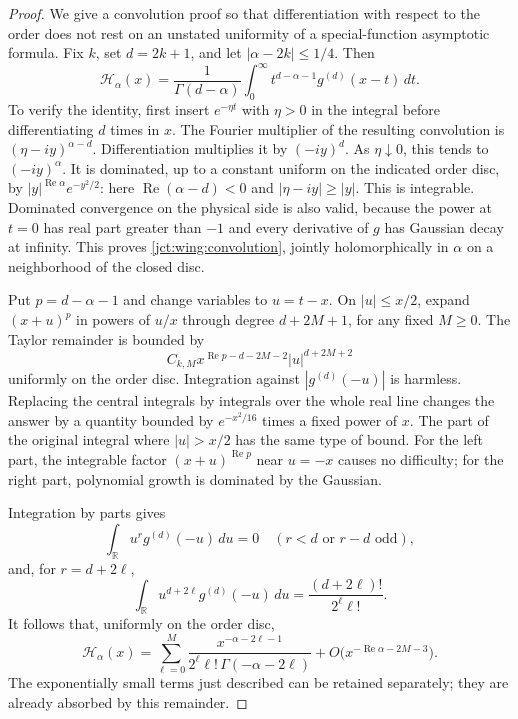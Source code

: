 \begin{proof}
We give a convolution proof so that differentiation with respect to
the order does not rest on an unstated uniformity of a special-function
asymptotic formula.  Fix $k$, set $d=2k+1$, and let
$|\alpha-2k|\le1/4$.  Then
\begin{equation}\label{jct:wing:convolution}
 \mathcal H_\alpha(x)
 =\frac1{\Gamma(d-\alpha)}\int_0^\infty
               t^{d-\alpha-1}g^{(d)}(x-t)\,dt.
\end{equation}
To verify the identity, first insert $e^{-\eta t}$ with $\eta>0$
in the integral before differentiating $d$ times in $x$.  The Fourier
multiplier of the resulting convolution is
$(\eta-iy)^{\alpha-d}$.  Differentiation multiplies it by
$(-iy)^d$.  As $\eta\downarrow0$, this tends to $(-iy)^\alpha$.
It is dominated, up to a constant uniform on the indicated order
disc, by $|y|^{\operatorname{Re}\alpha}e^{-y^2/2}$: here
$\operatorname{Re}(\alpha-d)<0$ and $|\eta-iy|\ge|y|$.
This is integrable.  Dominated convergence on the physical side is
also valid, because the power at $t=0$ has real part greater than
$-1$ and every derivative of $g$ has Gaussian decay at infinity.
This proves \eqref{jct:wing:convolution}, jointly holomorphically in
$\alpha$ on a neighborhood of the closed disc.

Put $p=d-\alpha-1$ and change variables to $u=t-x$.  On
$|u|\le x/2$, expand $(x+u)^p$ in powers of $u/x$ through degree
$d+2M+1$, for any fixed $M\ge0$.  The Taylor remainder is bounded by
\[
 C_{k,M}x^{\operatorname{Re}p-d-2M-2}|u|^{d+2M+2}
\]
uniformly on the order disc.  Integration against
$|g^{(d)}(-u)|$ is harmless.  Replacing the central integrals by
integrals over the whole real line changes the answer by a quantity
bounded by $e^{-x^2/16}$ times a fixed power of $x$.
The part of the original integral where $|u|>x/2$ has the same
type of bound.  For the left part, the integrable factor
$(x+u)^{\operatorname{Re}p}$ near $u=-x$ causes no difficulty;
for the right part, polynomial growth is dominated by the Gaussian.

Integration by parts gives
\[
 \int_{\mathbb R}u^r g^{(d)}(-u)\,du=0
 \quad(r<d\text{ or }r-d\text{ odd}),
\]
and, for $r=d+2\ell$,
\[
 \int_{\mathbb R}u^{d+2\ell}g^{(d)}(-u)\,du
 =\frac{(d+2\ell)!}{2^\ell\ell!}.
\]
It follows that, uniformly on the order disc,
\begin{equation}\label{jct:wing:uniform-tail-expansion}
 \mathcal H_\alpha(x)
 =\sum_{\ell=0}^{M}
       \frac{x^{-\alpha-2\ell-1}}
            {2^\ell\ell!\,\Gamma(-\alpha-2\ell)}
       +O\bigl(x^{-\operatorname{Re}\alpha-2M-3}\bigr).
\end{equation}
The exponentially small terms just described can be retained
separately; they are already absorbed by this remainder.


\end{proof}

